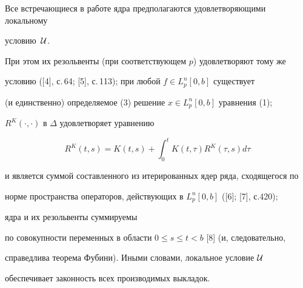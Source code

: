 Все встречающиеся в работе ядра предполагаются удовлетворяющими локальному 


условию~$\cal U$.


При этом их резольвенты (при соответствующем $p$)  удовлетворяют тому же


условию ([4], с.\,64; [5], с.\,113);  при любой $f\in L_p^n[0,b]$ существует


(и единственно) определяемое (3) решение  $x\in L_p^n[0,b]$ уравнения (1);


$R^K(\cdot,\cdot)$ в $\Delta$ удовлетворяет уравнению


$$


R^K(t,s)=K(t,s)+\int_0^t K(t,\tau)R^K(\tau,s)d\tau


$$


и является суммой составленного из итерированных ядер ряда, сходящегося по 


норме пространства операторов, действующих в $L_p^n[0,b]$ ([6]; [7], с.420);


ядра и их резольвенты суммируемы


по совокупности переменных в области $0\le s\le t<b$ [8] (и, следовательно,


справедлива теорема Фубини). Иными словами, локальное условие $\cal U$


обеспечивает законность всех производимых выкладок.





